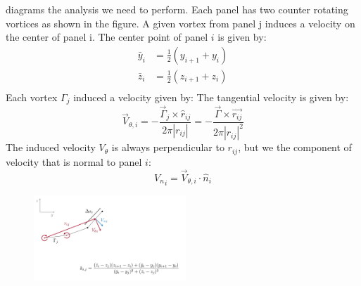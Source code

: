 \documentclass{article}
\begin{document}
 diagrams the analysis we need to perform.  Each panel has two counter rotating vortices as shown in the figure.  A given vortex from panel j induces a velocity on the center of  panel i. The center point of panel $i$ is given by:
\begin{align}
\bar{y}_i &= \frac{1}{2} (y_{i+1} + y_i)\\
\bar{z}_i &= \frac{1}{2} (z_{i+1} + z_i)\\
\end{align}
Each vortex $\Gamma_j$ induced a velocity given by:
The tangential velocity is given by:
\begin{equation}
\vec{V}_{\theta, i} = - \frac{\vec\Gamma_j \times \hat{r}_{ij}}{2 \pi |r_{ij}|} = - \frac{\vec\Gamma \times \vec{r_{ij}}}{2 \pi |r_{ij}|^2}
\end{equation}
The induced velocity $V_\theta$ is always perpendicular to $r_{ij}$, but we the component of velocity that is normal to panel $i$:
\begin{equation}
{V_n}_i = \vec{V}_{\theta, i} \cdot \hat{n}_i
\end{equation}

\begin{figure}[htbp]
\centering
\includegraphics[width=2.25in]{figs/induced}
\caption{}
\label{fig:induced}
\end{figure}
\end{document}
